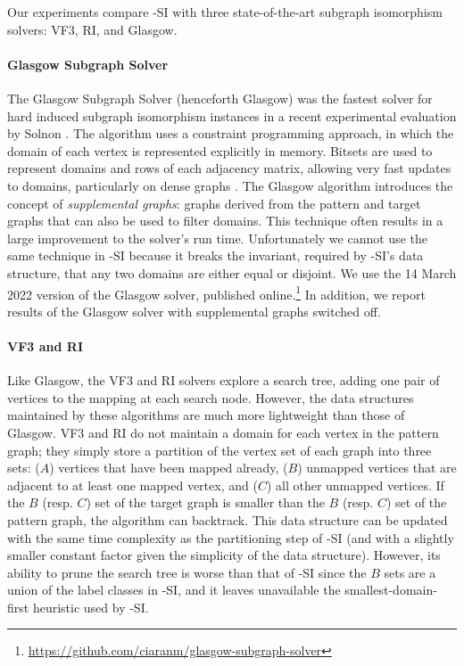 Our experiments compare \McSplit-SI with three state-of-the-art subgraph isomorphism solvers:
VF3, RI, and Glasgow.  

\paragraph*{Glasgow Subgraph Solver}
The Glasgow Subgraph Solver \cite{DBLP:conf/cp/McCreeshP15,DBLP:conf/gg/McCreeshP020}
(henceforth Glasgow)
was the fastest solver for hard induced subgraph isomorphism instances in a recent
experimental evaluation by Solnon \cite{DBLP:conf/gbrpr/Solnon19}.  The algorithm
uses a constraint programming approach, in which the domain of each vertex is represented
explicitly in memory.  Bitsets are used to represent domains and rows of each adjacency
matrix, allowing very fast updates to domains, particularly on dense graphs
\cite{ullmann1976algorithm}.  The Glasgow algorithm introduces the concept of
\emph{supplemental graphs}: graphs derived from the pattern and target graphs that
can also be used to filter domains.  This technique often results in a large
improvement to the solver's run time.  Unfortunately we cannot use the same technique
in \McSplit-SI because it breaks the invariant, required by \McSplit-SI's data structure,
that any two domains are either equal or disjoint.
We use the 14 March 2022 version of the Glasgow solver, published
online.\footnote{\url{https://github.com/ciaranm/glasgow-subgraph-solver}}
In addition, we report results of the Glasgow solver with supplemental graphs
switched off.

\paragraph*{VF3 and RI}
Like Glasgow, the VF3 \cite{DBLP:journals/pami/CarlettiFSV18} and RI
\cite{DBLP:journals/bmcbi/BonniciGPSF13,DBLP:journals/tcbb/BonniciG17}
solvers explore a search tree, adding one pair of vertices to the mapping at each
search node.  However, the data structures maintained by these algorithms are
much more lightweight than those of Glasgow.  VF3 and RI do not maintain
a domain for each vertex in the pattern graph; they simply store a partition
of the vertex set of each graph into three sets: ($A$) vertices that have been
mapped already, ($B$) unmapped vertices that are adjacent to at least one mapped vertex, and
($C$) all other unmapped vertices.
If the $B$ (resp. $C$) set of the target graph is smaller than the $B$ (resp. $C$)
set of the pattern graph, the algorithm can backtrack.
This data structure can be updated with the same
time complexity as the partitioning step of \McSplit-SI (and with a slightly
smaller constant factor given the simplicity of the data structure).  
However, its ability to prune the search tree is worse than that of \McSplit-SI
since the $B$ sets are a union of the label classes in \McSplit-SI, and it
leaves unavailable the smallest-domain-first heuristic used by \McSplit-SI.

